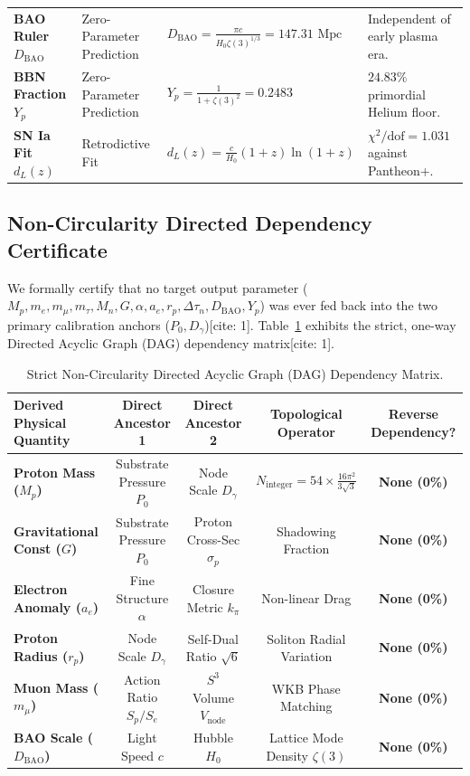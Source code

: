 \documentclass[11pt,a4paper]{article}
\begin{document}
\begin{table}[H]
\begin{tabular}{p{3.2cm}p{3.4cm}p{4.6cm}p{4.6cm}}
			\addlinespace
			\textbf{BAO Ruler $D_{\text{BAO}}$} & Zero-Parameter Prediction & $D_{\text{BAO}} = \frac{\pi c}{H_0 \zeta(3)^{1/3}} = 147.31\text{ Mpc}$ & Independent of early plasma era. \\
			\addlinespace
			\textbf{BBN Fraction $Y_p$} & Zero-Parameter Prediction & $Y_p = \frac{1}{1+\zeta(3)^2} = 0.2483$ & $24.83\%$ primordial Helium floor. \\
			\addlinespace
			\textbf{SN Ia Fit $d_L(z)$} & Retrodictive Fit & $d_L(z) = \frac{c}{H_0}(1+z)\ln(1+z)$ & $\chi^2/\text{dof} = 1.031$ against Pantheon+. \\
			\bottomrule
		\end{tabular}
	\end{table}
	
	\subsection{Non-Circularity Directed Dependency Certificate}
	We formally certify that no target output parameter ($M_p, m_e, m_\mu, m_\tau, M_n, G, \alpha, a_e, r_p, \Delta\tau_n, D_{\text{BAO}}, Y_p$) was ever fed back into the two primary calibration anchors ($P_0, D_\gamma$)[cite: 1]. Table~\ref{tab:dag_certificate} exhibits the strict, one-way Directed Acyclic Graph (DAG) dependency matrix[cite: 1].
	
	\begin{table}[H]
		\centering
		\caption{Strict Non-Circularity Directed Acyclic Graph (DAG) Dependency Matrix.}
		\label{tab:dag_certificate}
		\begin{tabular}{lcccc}
			\toprule
			\textbf{Derived Physical Quantity} & \textbf{Direct Ancestor 1} & \textbf{Direct Ancestor 2} & \textbf{Topological Operator} & \textbf{Reverse Dependency?} \\
			\midrule
			\textbf{Proton Mass ($M_p$)} & Substrate Pressure $P_0$ & Node Scale $D_\gamma$ & $N_{\text{integer}} = 54 \times \frac{16\pi^2}{3\sqrt{3}}$ & \textbf{None (0\%)} \\
			\textbf{Gravitational Const ($G$)} & Substrate Pressure $P_0$ & Proton Cross-Sec $\sigma_p$ & Shadowing Fraction & \textbf{None (0\%)} \\
			\textbf{Electron Anomaly ($a_e$)} & Fine Structure $\alpha$ & Closure Metric $k_\pi$ & Non-linear Drag & \textbf{None (0\%)} \\
			\textbf{Proton Radius ($r_p$)} & Node Scale $D_\gamma$ & Self-Dual Ratio $\sqrt{6}$ & Soliton Radial Variation & \textbf{None (0\%)} \\
			\textbf{Muon Mass ($m_\mu$)} & Action Ratio $S_p/S_e$ & $S^3$ Volume $V_{\text{node}}$ & WKB Phase Matching & \textbf{None (0\%)} \\
			\textbf{BAO Scale ($D_{\text{BAO}}$)} & Light Speed $c$ & Hubble $H_0$ & Lattice Mode Density $\zeta(3)$ & \textbf{None (0\%)} \\
			\bottomrule
		\end{tabular}
	\end{table}
	
\end{document}
